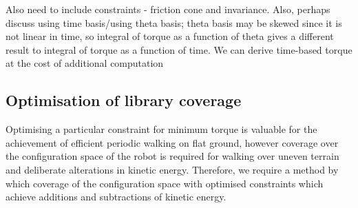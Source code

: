 {\color{red} Also need to include constraints - friction cone and invariance. Also, perhaps discuss using time basis/using theta basis; theta basis may be skewed since it is not linear in time, so integral of torque as a function of theta gives a different result to integral of torque as a function of time. We can derive time-based torque at the cost of additional computation}

\subsection{Optimisation of library coverage}
Optimising a particular constraint for minimum torque is valuable for the achievement of efficient periodic walking on flat ground, however coverage over the configuration space of the robot is required for walking over uneven terrain and deliberate alterations in kinetic energy. Therefore, we require a method by which coverage of the configuration space with optimised constraints which achieve additions and subtractions of kinetic energy.